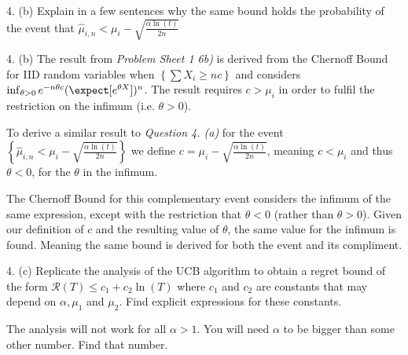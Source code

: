 \documentclass[11pt,a4paper]{article}
\begin{document}
\begin{question}{4. (b)}
  Explain in a few sentences why the same bound holds the probability of the event that $\hat\mu_{i,n}<\mu_i-\sqrt{\frac{\alpha\ln(t)}{2n}}$
\end{question}

\begin{answer}{4. (b)}
  The result from \textit{Problem Sheet 1 6b)} is derived from the Chernoff Bound for IID random variables when $\left\{\sum X_i\geq nc\right\}$ and considers $\inf_{\theta>0}e^{-n\theta c}(\expect[e^{\theta X}])^n$. The result requires $c>\mu_i$ in order to fulfil the restriction on the infimum (i.e. $\theta>0$).
  \par To derive a similar result to \textit{Question 4. (a)} for the event $\textstyle\left\{\hat\mu_{i,n}<\mu_i-\sqrt{\frac{\alpha\ln(t)}{2n}}\right\}$ we define $c=\mu_i-\sqrt{\frac{\alpha\ln(t)}{2n}}$, meaning $c<\mu_i$ and thus $\theta<0$, for the $\theta$ in the infimum.
  \par The Chernoff Bound for this complementary event considers the infimum of the same expression, except with the restriction that $\theta<0$ (rather than $\theta>0$). Given our definition of $c$ and the resulting value of $\theta$, the same value for the infimum is found. Meaning the same bound is derived for both the event and its compliment.
\end{answer}

\begin{question}{4. (c)}
  Replicate the analysis of the UCB algorithm to obtain a regret bound of the form $\mathcal{R}(T)\leq c_1+c_2\ln(T)$ where $c_1$ and $c_2$ are constants that may depend on $\alpha,\mu_1$ and $\mu_2$. Find explicit expressions for these constants.
  \par The analysis will not work for all $\alpha>1$. You will need $\alpha$ to be bigger than some other number. Find that number.
\end{question}
\end{document}
